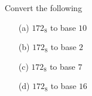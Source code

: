 Convert the following
\begin{enumerate}[nosep]
\item[(a)] $172_8$ to base $10$	
\item[(b)] $172_8$ to base $2$	
\item[(c)] $172_8$ to base $7$	
\item[(d)] $172_8$ to base $16$
\end{enumerate}
